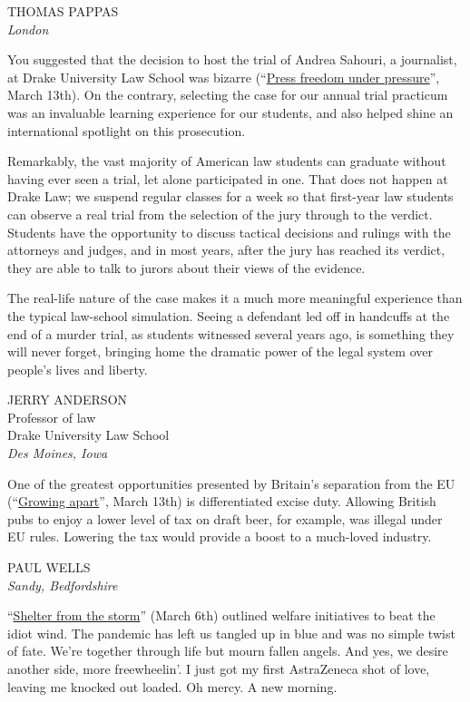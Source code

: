 \documentclass{article}
\begin{document}
THOMAS PAPPAS\\ \emph{London} 

You suggested that the decision to host the trial of Andrea Sahouri, a journalist, at Drake University Law School was bizarre (``\href{/united-states/2021/03/13/press-freedom-under-pressure}{Press freedom under pressure}'', March 13th). On the contrary, selecting the case for our annual trial practicum was an invaluable learning experience for our students, and also helped shine an international spotlight on this prosecution. 

Remarkably, the vast majority of American law students can graduate without having ever seen a trial, let alone participated in one. That does not happen at Drake Law; we suspend regular classes for a week so that first-year law students can observe a real trial from the selection of the jury through to the verdict. Students have the opportunity to discuss tactical decisions and rulings with the attorneys and judges, and in most years, after the jury has reached its verdict, they are able to talk to jurors about their views of the evidence. 

The real-life nature of the case makes it a much more meaningful experience than the typical law-school simulation. Seeing a defendant led off in handcuffs at the end of a murder trial, as students witnessed several years ago, is something they will never forget, bringing home the dramatic power of the legal system over people's lives and liberty. 

JERRY ANDERSON\\ Professor of law\\ Drake University Law School\\ \emph{Des Moines, Iowa} 

One of the greatest opportunities presented by Britain's separation from the EU (``\href{/leaders/2021/03/13/how-britain-can-benefit-from-brexit}{Growing apart}'', March 13th) is differentiated excise duty. Allowing British pubs to enjoy a lower level of tax on draft beer, for example, was illegal under EU rules. Lowering the tax would provide a boost to a much-loved industry. 

PAUL WELLS\\ \emph{Sandy, Bedfordshire} 

``\href{/briefing/2021/03/06/covid-19-has-transformed-the-welfare-state-which-changes-will-endure}{Shelter from the storm}'' (March 6th) outlined welfare initiatives to beat the idiot wind. The pandemic has left us tangled up in blue and was no simple twist of fate. We're together through life but mourn fallen angels. And yes, we desire another side, more freewheelin'. I just got my first AstraZeneca shot of love, leaving me knocked out loaded. Oh mercy. A new morning. 
\end{document}
